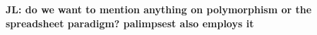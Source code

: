 \documentclass{sigchi}
\newcommand {\jingyi}[1]{{\color{purple}\bf{JL: #1}\normalfont}}
\begin{document}

   





\jingyi{do we want to mention anything on polymorphism or the spreadsheet paradigm? palimpsest also employs it}

\end{document}
